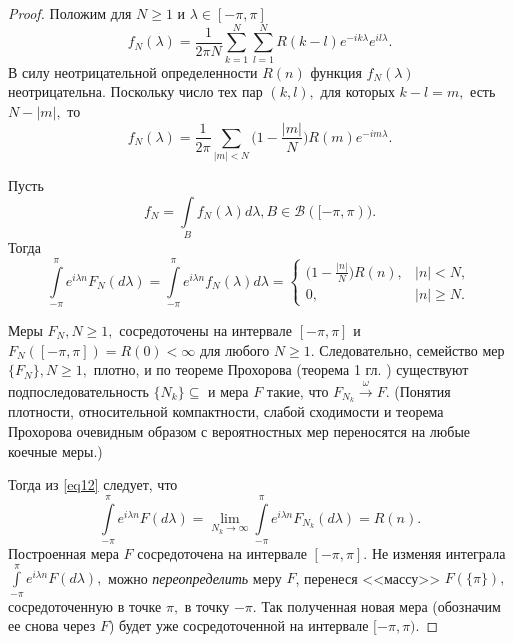 \begin{proof}
Положим для $N \geq 1 $ и $\lambda \in [-\pi, \pi]$
\begin{equation}\label{eq10} 
    f_N (\lambda) = \frac{1}{2\pi N} \sum_{k=1}^{N} \sum_{l=1}^{N} R(k-l) e^{-i k \lambda} e^{i l \lambda}.
\end{equation}
В силу неотрицательной определенности $R(n)$ функция $f_N(\lambda)$ неотрицательна. Поскольку число тех пар $(k, l),$ для которых $k-l=m,$ есть $N-|m|,$ то
\begin{equation}\label{eq11} 
    f_N (\lambda) = \frac{1}{2\pi} \sum_{|m| < N} \Big( 1-\frac{|m|}{N} \Big) R(m) e^{-i m \lambda}.
\end{equation}

Пусть 
$$f_N=\int\limits_{B} f_N(\lambda)d\lambda, B \in \mathcal{B}([ -\pi, \pi)).$$
Тогда 
\begin{equation}\label{eq12} 
    \int\limits_{-\pi}^{\pi} e^{i\lambda n} F_N(d\lambda) = \int\limits_{-\pi}^{\pi} e^{i \lambda n}f_N(\lambda)d\lambda = 
    \begin{cases}
        \Big( 1 - \frac{|n|}{N}\Big) R(n),  & |n| < N, \\
        0, & |n| \geq N.
    \end{cases}
\end{equation}


Меры $F_N, N \geq 1,$ сосредоточены на интервале $[-\pi, \pi]$ и $F_N ([-\pi, \pi]) = R(0) < \infty$ для любого $N \geq 1.$ Следовательно, семейство мер $\{F_N\}, N \geq 1, $ плотно, и по теореме Прохорова (теорема 1  гл.  ) существуют подпоследовательность $\{N_k\} \subseteq $ и мера $F$ такие, что $F_{N_k} \stackrel{\omega}{\longrightarrow} F.$ (Понятия плотности, относительной компактности, слабой сходимости и теорема Прохорова очевидным образом с вероятностных мер переносятся на любые коечные меры.)


Тогда из \ref{eq12} следует, что 
$$\int\limits_{-\pi}^{\pi} e^{i\lambda n} F(d \lambda) = \lim_{N_k\to\infty} \int\limits_{-\pi}^{\pi} e^{i\lambda n} F_{N_{k}} (d\lambda) = R(n).$$
Построенная мера $F$ сосредоточена на интервале $[-\pi, \pi].$ Не изменяя интеграла $\int\limits_{-\pi}^{\pi} e^{i \lambda n} F (d\lambda),$ можно \textit{переопределить} меру $F$, перенеся <<массу>> $F(\{\pi\}),$ сосредоточенную в точке $\pi,$ в точку $-\pi.$ Так полученная новая мера (обозначим ее снова через $F$) будет уже сосредоточенной на интервале $[-\pi, \pi).$
\end{proof}


